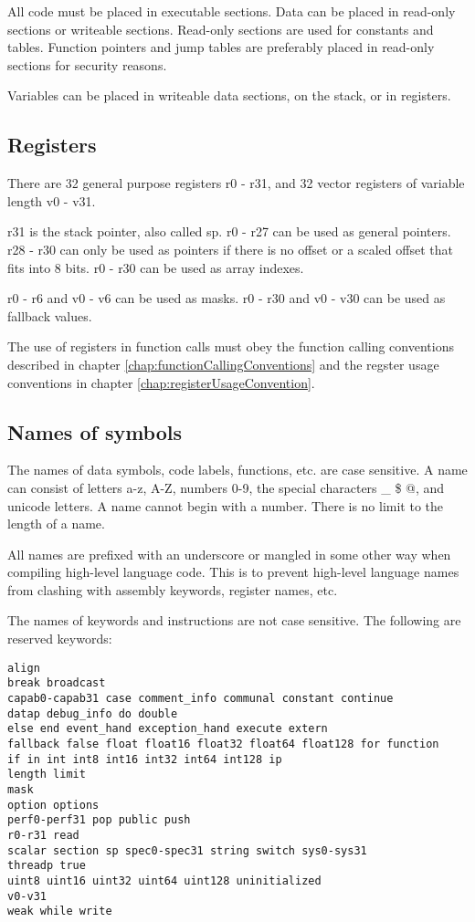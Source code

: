 \documentclass[forwardcom.tex]{subfiles}
\begin{document}
All code must be placed in executable sections. 
Data can be placed in read-only sections or writeable sections. Read-only sections are used for constants and tables. 
Function pointers and jump tables are preferably placed in read-only sections for security reasons.

Variables can be placed in writeable data sections, on the stack, or in registers.
\vv



\subsection{Registers} \label{AsmRegisters}
There are 32 general purpose registers r0 - r31, and 32 vector registers of variable length v0 - v31.
\vv

r31 is the stack pointer, also called sp. r0 - r27 can be used as general pointers. r28 - r30 can only be used as pointers if there is no offset or a scaled offset that fits into 8 bits. r0 - r30 can be used as array indexes.
\vv

r0 - r6 and v0 - v6 can be used as masks. r0 - r30 and v0 - v30 can be used as fallback values.

\vv
The use of registers in function calls must obey the function calling conventions described in chapter \ref{chap:functionCallingConventions} and the regster usage conventions in chapter
\ref{chap:registerUsageConvention}.
\vv


\subsection{Names of symbols} \label{assemblerNames}
The names of data symbols, code labels, functions, etc. are case sensitive. 
A name can consist of letters a-z, A-Z, numbers 0-9, the special characters \_ \$ @, 
and unicode letters. A name cannot begin with a number. There is no limit to the length of a name.
\vv

All names are prefixed with an underscore or mangled in some other way when compiling high-level language code. This is to prevent high-level language names from clashing with assembly keywords, register names, etc.
\vv

The names of keywords and instructions are not case sensitive.
The following are reserved keywords:
\begin{lstlisting}[frame=single]
align 
break broadcast
capab0-capab31 case comment_info communal constant continue
datap debug_info do double 
else end event_hand exception_hand execute extern 
fallback false float float16 float32 float64 float128 for function 
if in int int8 int16 int32 int64 int128 ip 
length limit
mask
option options
perf0-perf31 pop public push
r0-r31 read
scalar section sp spec0-spec31 string switch sys0-sys31
threadp true
uint8 uint16 uint32 uint64 uint128 uninitialized
v0-v31 
weak while write
\end{lstlisting}
\vv
\end{document}
